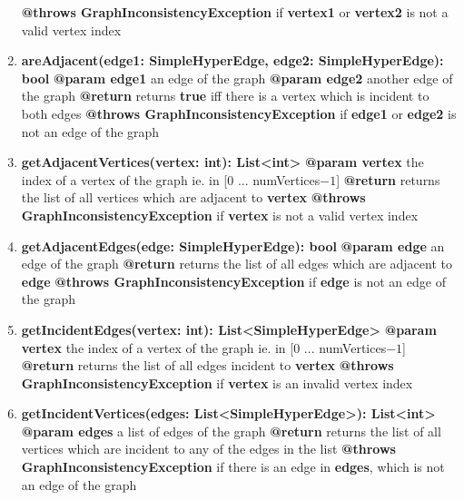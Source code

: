 \documentclass{article}
\begin{document}
\begin{enumerate}[+]
{			\textbf{@throws GraphInconsistencyException} if \textbf{vertex1} or \textbf{vertex2} is not a valid vertex index
		}
		\item{
			\textbf{areAdjacent(edge1: SimpleHyperEdge, edge2: SimpleHyperEdge): bool} \newline
			\textbf{@param edge1} an edge of the graph \newline
			\textbf{@param edge2} another edge of the graph \newline
			\textbf{@return} returns \textbf{true} iff there is a vertex which is incident to both edges \newline
			\textbf{@throws GraphInconsistencyException} if \textbf{edge1} or \textbf{edge2} is not an edge of the graph
		}
		\item{
			\textbf{getAdjacentVertices(vertex: int): List<int>} \newline
			\textbf{@param vertex} the index of a vertex of the graph ie. in [0 ... numVertices$-1$] \newline
			\textbf{@return} returns the list of all vertices which are adjacent to \textbf{vertex} \newline
			\textbf{@throws GraphInconsistencyException} if \textbf{vertex} is not a valid vertex index
		}
		\item{
			\textbf{getAdjacentEdges(edge: SimpleHyperEdge): bool} \newline
			\textbf{@param edge} an edge of the graph \newline
			\textbf{@return} returns the list of all edges which are adjacent to \textbf{edge} \newline
			\textbf{@throws GraphInconsistencyException} if \textbf{edge} is not an edge of the graph
		}
		\item{
			\textbf{getIncidentEdges(vertex: int): List<SimpleHyperEdge>} \newline
			\textbf{@param vertex} the index of a vertex of the graph ie. in [0 ... numVertices$-1$] \newline
			\textbf{@return} returns the list of all edges incident to \textbf{vertex} \newline
			\textbf{@throws GraphInconsistencyException} if \textbf{vertex} is an invalid vertex index
		}
		\item{
			\textbf{getIncidentVertices(edges: List<SimpleHyperEdge>): List<int>} \newline
			\textbf{@param edges} a list of edges of the graph \newline
			\textbf{@return} returns the list of all vertices which are incident to any of the edges in the list \newline
			\textbf{@throws GraphInconsistencyException} if there is an edge in \textbf{edges}, which is not an edge of the graph
			
}
\end{enumerate}
\end{document}
